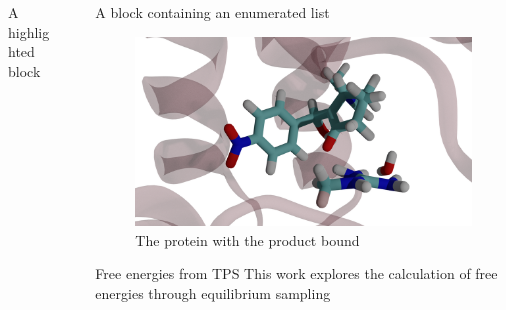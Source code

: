 \documentclass[final]{beamer}
\newlength{\sepwidth}
\newlength{\colwidth}
\newcommand{\separatorcolumn}{\begin{column}{\sepwidth}\end{column}}
\begin{document}
\begin{frame}[t]
\begin{columns}[t]
\begin{column}{\colwidth}
\begin{block}{A highlighted block}
  \end{block}

\end{column}

\separatorcolumn

\begin{column}{\colwidth}

  \begin{block}{A block containing an enumerated list}
   \begin{figure}
        \centering
        \includegraphics[scale=0.5]{figures/prod-121.png}
        \caption{The protein with the product bound}
    \end{figure}
    
  \end{block}

  \begin{block}{Free energies from TPS}
This work explores the calculation of free energies through equilibrium sampling \cite{Balasubramani22JPhysChemB126p5413}

  \end{block}


\end{column}
\end{columns}
\end{frame}
\end{document}
